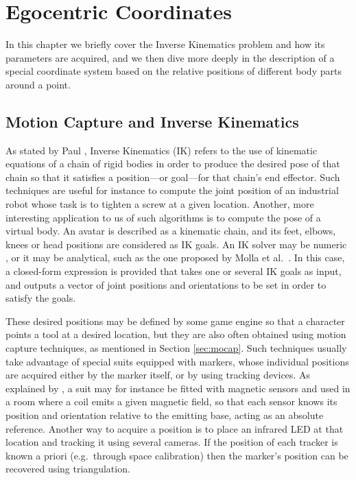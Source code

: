 
\chapter{Egocentric Coordinates}

\label{Chapter2}

In this chapter we briefly cover the Inverse Kinematics problem and how its parameters are acquired, and we then dive more deeply in the description of a special coordinate system based on the relative positions of different body parts around a point.

\section{Motion Capture and Inverse Kinematics}

As stated by Paul \cite{paul1981robot}, Inverse Kinematics (IK) refers to the use of kinematic equations of a chain of rigid bodies in order to produce the desired pose of that chain so that it satisfies a position---or goal---for that chain's end effector. Such techniques are useful for instance to compute the joint position of an industrial robot whose task is to tighten a screw at a given location. Another, more interesting application to us of such algorithms is to compute the pose of a virtual body. An avatar is described as a kinematic chain, and its feet, elbows, knees or head positions are considered as IK goals. An IK solver may be numeric \cite{goldenberg1985complete,manocha1994efficient}, or it may be analytical, such as the one proposed by Molla et al.\ \cite{molla2013singularity}. In this case, a closed-form expression is provided that takes one or several IK goals as input, and outputs a vector of joint positions and orientations to be set in order to satisfy the goals.

These desired positions may be defined by some game engine so that a character points a tool at a desired location, but they are also often obtained using motion capture techniques, as mentioned in Section \ref{sec:mocap}. Such techniques usually take advantage of special suits equipped with markers, whose individual positions are acquired either by the marker itself, or by using tracking devices. As explained by \cite{west1995motion}, a suit may for instance be fitted with magnetic sensors and used in a room where a coil emits a given magnetic field, so that each sensor knows its position and orientation relative to the emitting base, acting as an absolute reference. Another way to acquire a position is to place an infrared LED at that location and tracking it using several cameras. If the position of each tracker is known a priori (e.g.\ through space calibration) then the marker's position can be recovered using triangulation.

